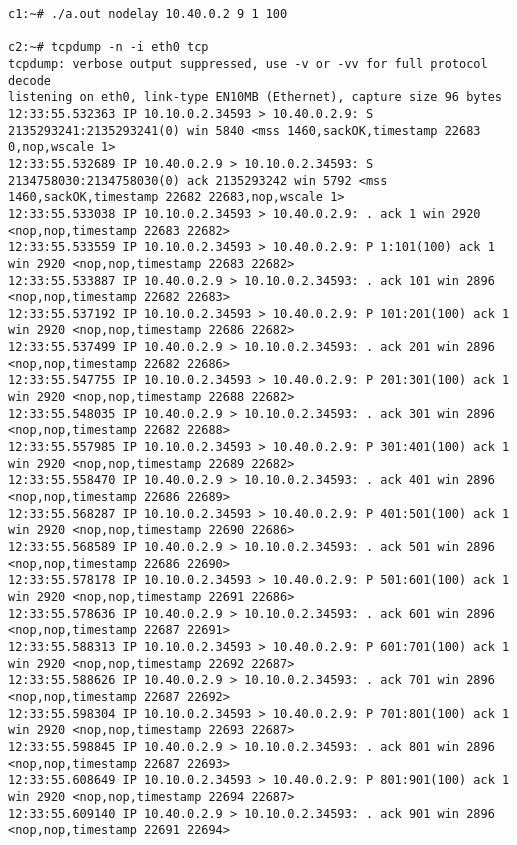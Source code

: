 \documentclass[a4paper,12pt]{article}
\begin{document}
\begin{lstlisting}
c1:~# ./a.out nodelay 10.40.0.2 9 1 100

c2:~# tcpdump -n -i eth0 tcp
tcpdump: verbose output suppressed, use -v or -vv for full protocol decode
listening on eth0, link-type EN10MB (Ethernet), capture size 96 bytes
12:33:55.532363 IP 10.10.0.2.34593 > 10.40.0.2.9: S 2135293241:2135293241(0) win 5840 <mss 1460,sackOK,timestamp 22683 0,nop,wscale 1>
12:33:55.532689 IP 10.40.0.2.9 > 10.10.0.2.34593: S 2134758030:2134758030(0) ack 2135293242 win 5792 <mss 1460,sackOK,timestamp 22682 22683,nop,wscale 1>
12:33:55.533038 IP 10.10.0.2.34593 > 10.40.0.2.9: . ack 1 win 2920 <nop,nop,timestamp 22683 22682>
12:33:55.533559 IP 10.10.0.2.34593 > 10.40.0.2.9: P 1:101(100) ack 1 win 2920 <nop,nop,timestamp 22683 22682>
12:33:55.533887 IP 10.40.0.2.9 > 10.10.0.2.34593: . ack 101 win 2896 <nop,nop,timestamp 22682 22683>
12:33:55.537192 IP 10.10.0.2.34593 > 10.40.0.2.9: P 101:201(100) ack 1 win 2920 <nop,nop,timestamp 22686 22682>
12:33:55.537499 IP 10.40.0.2.9 > 10.10.0.2.34593: . ack 201 win 2896 <nop,nop,timestamp 22682 22686>
12:33:55.547755 IP 10.10.0.2.34593 > 10.40.0.2.9: P 201:301(100) ack 1 win 2920 <nop,nop,timestamp 22688 22682>
12:33:55.548035 IP 10.40.0.2.9 > 10.10.0.2.34593: . ack 301 win 2896 <nop,nop,timestamp 22682 22688>
12:33:55.557985 IP 10.10.0.2.34593 > 10.40.0.2.9: P 301:401(100) ack 1 win 2920 <nop,nop,timestamp 22689 22682>
12:33:55.558470 IP 10.40.0.2.9 > 10.10.0.2.34593: . ack 401 win 2896 <nop,nop,timestamp 22686 22689>
12:33:55.568287 IP 10.10.0.2.34593 > 10.40.0.2.9: P 401:501(100) ack 1 win 2920 <nop,nop,timestamp 22690 22686>
12:33:55.568589 IP 10.40.0.2.9 > 10.10.0.2.34593: . ack 501 win 2896 <nop,nop,timestamp 22686 22690>
12:33:55.578178 IP 10.10.0.2.34593 > 10.40.0.2.9: P 501:601(100) ack 1 win 2920 <nop,nop,timestamp 22691 22686>
12:33:55.578636 IP 10.40.0.2.9 > 10.10.0.2.34593: . ack 601 win 2896 <nop,nop,timestamp 22687 22691>
12:33:55.588313 IP 10.10.0.2.34593 > 10.40.0.2.9: P 601:701(100) ack 1 win 2920 <nop,nop,timestamp 22692 22687>
12:33:55.588626 IP 10.40.0.2.9 > 10.10.0.2.34593: . ack 701 win 2896 <nop,nop,timestamp 22687 22692>
12:33:55.598304 IP 10.10.0.2.34593 > 10.40.0.2.9: P 701:801(100) ack 1 win 2920 <nop,nop,timestamp 22693 22687>
12:33:55.598845 IP 10.40.0.2.9 > 10.10.0.2.34593: . ack 801 win 2896 <nop,nop,timestamp 22687 22693>
12:33:55.608649 IP 10.10.0.2.34593 > 10.40.0.2.9: P 801:901(100) ack 1 win 2920 <nop,nop,timestamp 22694 22687>
12:33:55.609140 IP 10.40.0.2.9 > 10.10.0.2.34593: . ack 901 win 2896 <nop,nop,timestamp 22691 22694>

\end{lstlisting}
\end{document}
